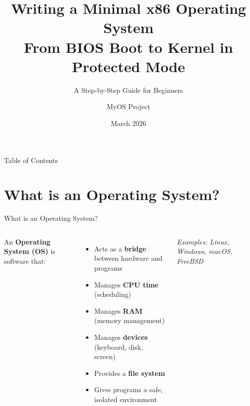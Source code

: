 \documentclass[aspectratio=169]{beamer}
\title[Writing a Minimal x86 OS]{%
  \textbf{Writing a Minimal x86 Operating System}\\
  \small From BIOS Boot to Kernel in Protected Mode}
\subtitle{A Step-by-Step Guide for Beginners}
\author{MyOS Project}
\date{March 2026}
\institute{From scratch, in Assembly and C}
\begin{document}
\begin{frame}
  \titlepage
\end{frame}

\begin{frame}{Table of Contents}
  \tableofcontents
\end{frame}

\section{What is an Operating System?}

\begin{frame}{What is an Operating System?}
  \begin{columns}[T]
    An \textbf{Operating System (OS)} is software that:
    \begin{itemize}
      \item Acts as a \textbf{bridge} between hardware and programs
      \item Manages \textbf{CPU time} (scheduling)
      \item Manages \textbf{RAM} (memory management)
      \item Manages \textbf{devices} (keyboard, disk, screen)
      \item Provides a \textbf{file system}
      \item Gives programs a safe, isolated environment
    \end{itemize}
    \vspace{6pt}
    \textit{Examples: Linux, Windows, macOS, FreeBSD}
    \vspace{8pt}
    \begin{center}
    \end{center}
  \end{columns}
\end{frame}
\end{document}
